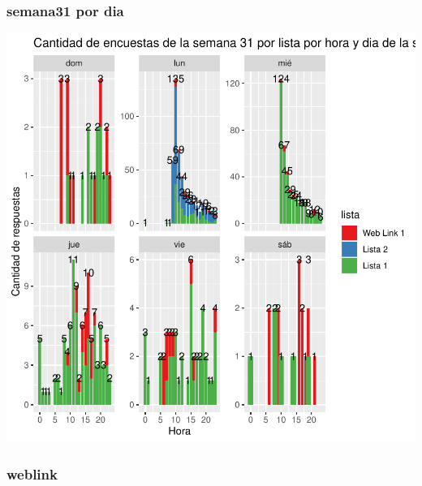\documentclass{article}
\begin{document}
\subsubsection{semana31 por dia}

\includegraphics{seguimientov5-016}

\subsubsection{weblink}
\end{document}

